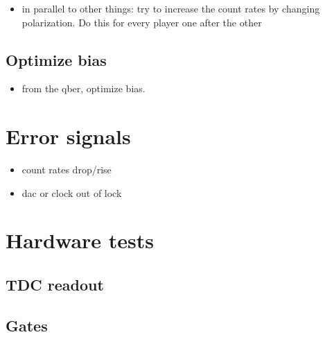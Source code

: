 \documentclass[10pt]{article}
\begin{document}
\begin{itemize}
    \item in parallel to other things: try to increase the count rates by changing polarization. Do this for every player one after the other
\end{itemize}

\subsection{Optimize bias}

\begin{itemize}
    \item from the qber, optimize bias.
\end{itemize}

\section{Error signals}

\begin{itemize}
    \item count rates drop/rise
    \item dac or clock out of lock
\end{itemize}

\section{Hardware tests}

\subsection{TDC readout}


\subsection{Gates}
\end{document}
